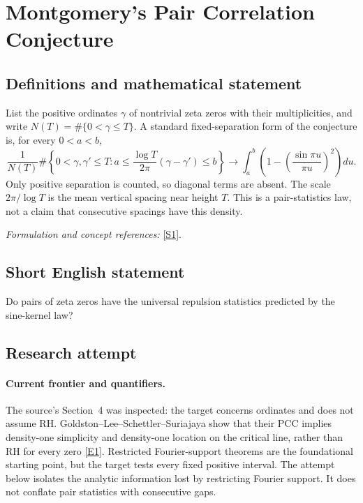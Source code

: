 \documentclass[11pt,a4paper]{article}
\numberwithin{equation}{section}
\newcommand{\sref}[2]{\hyperlink{source:#1:#2}{[S#2]}}
\newcommand{\eref}[2]{\hyperlink{extra:#1:#2}{[E#2]}}
\newif\ifshowcatalogue
\newcommand{\cataloguescope}[1]{\ifshowcatalogue
 \paragraph{Exact scope in the supplied catalogue.}
 \begin{quote}\small #1\end{quote}\fi}
\begin{document}
\setcounter{section}{0}
\section*{\texorpdfstring{Montgomery's Pair Correlation Conjecture}{Montgomery's Pair Correlation Conjecture}}\label{statement}
\subsection{Definitions and mathematical statement}
List the positive ordinates $\gamma$ of nontrivial zeta zeros with their multiplicities, and write $N(T)=\#\{0<\gamma\le T\}$. A standard fixed-separation form of the conjecture is, for every $0<a<b$,
\[
 \frac{1}{N(T)}\#\left\{0<\gamma,\gamma'\le T:
 a\le\frac{\log T}{2\pi}(\gamma-\gamma')\le b\right\}
 \longrightarrow\int_a^b\left(1-\left(\frac{\sin\pi u}{\pi u}\right)^2\right)du.
\]
Only positive separation is counted, so diagonal terms are absent. The scale $2\pi/\log T$ is the mean vertical spacing near height $T$. This is a pair-statistics law, not a claim that consecutive spacings have this density.
\par\smallskip\textit{Formulation and concept references:} \sref{statement}{1}.
\cataloguescope{Prove that normalized vertical gaps between pairs of nontrivial zeros of the Riemann zeta function have limiting pair density 1 - (sin(pi u)/(pi u))\textasciicircum{}2 at fixed positive normalized separation.}
\subsection{Short English statement}
Do pairs of zeta zeros have the universal repulsion statistics predicted by the sine-kernel law?
\subsection{Research attempt}

\paragraph{Current frontier and quantifiers.}
The source's Section~4 was inspected: the target concerns ordinates and does
not assume RH. Goldston--Lee--Schettler--Suriajaya show that their PCC
implies density-one simplicity and density-one location on the critical
line, rather than RH for every zero \eref{statement}{1}.
Restricted Fourier-support theorems are the foundational starting point,
but the target tests every fixed positive interval. The attempt below
isolates the analytic information lost by restricting Fourier support.
It does not conflate pair statistics with consecutive gaps.
\end{document}
